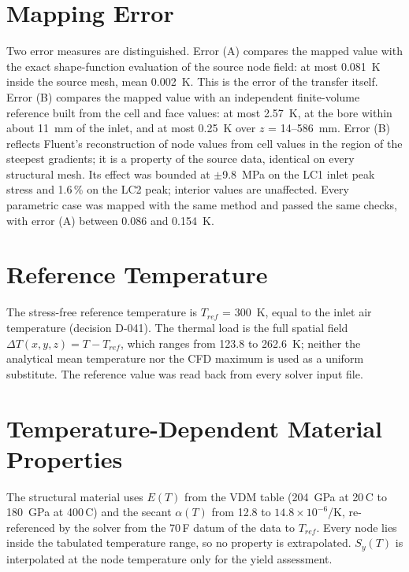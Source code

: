 \section{Mapping Error}
Two error measures are distinguished. Error (A) compares the mapped value with the exact shape-function evaluation of the source node
field: at most 0.081~K inside the source mesh, mean 0.002~K. This is the error of the transfer itself. Error (B) compares the mapped value
with an independent finite-volume reference built from the cell and face values: at most 2.57~K, at the bore within about 11~mm of the inlet,
and at most 0.25~K over $z$ = 14--586~mm. Error (B) reflects Fluent's reconstruction of node values from cell values in the region of the
steepest gradients; it is a property of the source data, identical on every structural mesh. Its effect was bounded at $\pm$9.8~MPa on the
LC1 inlet peak stress and 1.6\,\% on the LC2 peak; interior values are unaffected. Every parametric case was mapped with the same method and
passed the same checks, with error (A) between 0.086 and 0.154~K.

\section{Reference Temperature}
The stress-free reference temperature is $T_{ref}$ = 300~K, equal to the inlet air temperature (decision D-041).
The thermal load is the full spatial field $\Delta T(x,y,z) = T - T_{ref}$, which ranges from 123.8 to 262.6~K; neither the analytical mean
temperature nor the CFD maximum is used as a uniform substitute. The reference value was read back from every solver input file.

\section{Temperature-Dependent Material Properties}
The structural material uses $E(T)$ from the VDM table (204~GPa at 20\,\textdegree C to 180~GPa at 400\,\textdegree C) and the secant $\alpha(T)$
from 12.8 to $14.8\times10^{-6}$/K, re-referenced by the solver from the 70\,\textdegree F datum of the data to $T_{ref}$. Every node lies
inside the tabulated temperature range, so no property is extrapolated. $S_y(T)$ is interpolated at the node temperature only for the yield
assessment.
